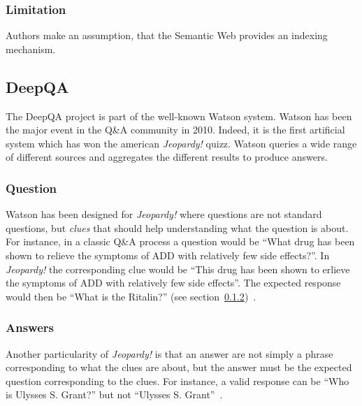 \documentclass[10pt,journal,letterpaper,compsoc]{IEEEtran}
\begin{document}
\subsubsection{Limitation}
Authors make an assumption, that the Semantic Web provides an indexing
mechanism.







\subsection{{\sc DeepQA}~\cite{DBLP:journals/aim/FerrucciBCFGKLMNPSW10}}
The {\sc DeepQA} project is part of the well-known {\sc Watson} system. 
{\sc Watson} has been the major event in the Q\&A community in 2010. Indeed, it
is the first artificial system which has won the american {\it Jeopardy!} quizz.
{\sc Watson} queries a wide range of different sources and aggregates the
different results to produce answers. 


\subsubsection{Question}
{\sc Watson} has been designed for {\it Jeopardy!} where questions are not
standard questions, but {\it clues} that should help understanding what the
question is about. For instance, in a classic Q\&A process a question would be ``What
drug has been shown to relieve the symptoms of ADD with relatively few side
effects?''. In {\it Jeopardy!} the corresponding clue would be ``This drug has
been shown to erlieve the symptoms of ADD with relatively few side effects''.
The expected response would then be ``What is the Ritalin?'' (see
section~\ref{sec:jeoparty-answers})~\cite{FerrucciBCFGKLMNPSW10}.


\subsubsection{Answers}
\label{sec:jeoparty-answers}
Another particularity of {\it Jeopardy!} is that an answer are not simply a
phrase corresponding to what the clues are about, but the answer must be the
expected question corresponding to the clues. For instance, a valid response
can be ``Who is Ulysses S. Grant?'' but not ``Ulysses S.
Grant''~\cite{FerrucciBCFGKLMNPSW10}. 
\end{document}
